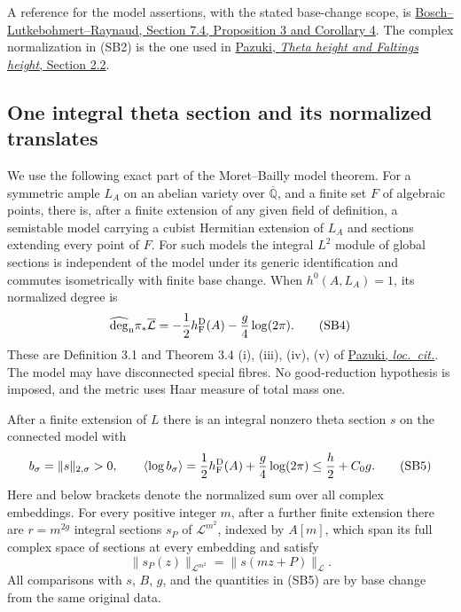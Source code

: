 A reference for the model assertions, with
the stated base-change scope, is
\href{https://www.math.stonybrook.edu/~kamenova/homepage_files/Bosch_Raynaud_Neron_Model_tc.pdf}
{Bosch--Lutkebohmert--Raynaud, Section 7.4,
Proposition 3 and Corollary 4}.
The complex normalization in (SB2) is the
one used in
\href{https://www.numdam.org/item/BSMF_2012__140_1_19_0.pdf}
{Pazuki, \emph{Theta height and Faltings height},
Section 2.2}.

\subsection{One integral theta section and its normalized translates}

We use the following exact part of the
Moret--Bailly model theorem.
For a symmetric ample \(L_A\) on an abelian
variety over \(\overline{\mathbb Q}\), and a
finite set \(F\) of algebraic points, there is,
after a finite extension of any given field
of definition, a semistable model carrying
a cubist Hermitian extension of \(L_A\) and
sections extending every point of \(F\).
For such models the integral \(L^2\) module of
global sections is independent of the model
under its generic identification and commutes
isometrically with finite base change.
When \(h^0(A,L_A)=1\), its normalized degree is
\[
 \widehat{\deg}_{\mathrm n}\pi_*\overline{\mathcal L}
       =-{1\over2}h_{\mathrm F}^{\mathrm D}(A)
                              -{g\over4}\log(2\pi).  \tag{SB4}
\]
These are Definition 3.1 and Theorem 3.4
(i), (iii), (iv), (v) of
\href{https://www.numdam.org/item/BSMF_2012__140_1_19_0.pdf}
{Pazuki, \emph{loc.\ cit.}}.
The model may have disconnected special
fibres. No good-reduction hypothesis is
imposed, and the metric uses Haar measure
of total mass one.

\begin{srlemma}\label{lem:sr-slope-joint-theta-witness}
After a finite extension of \(L\) there is an
integral nonzero theta section \(s\) on the
connected model with
\[
 b_\sigma=\|s\|_{2,\sigma}>0,\qquad
 \langle\log b_\sigma\rangle
       ={1\over2}h_{\mathrm F}^{\mathrm D}(A)
                               +{g\over4}\log(2\pi)
       \le {h\over2}+C_0g.                           \tag{SB5}
\]
Here and below brackets denote the normalized
sum over all complex embeddings.
For every positive integer \(m\), after a
further finite extension there are
\(r=m^{2g}\) integral sections \(s_P\) of
\(\mathcal L^{m^2}\), indexed by \(A[m]\),
which span its full complex space of sections
at every embedding and satisfy
\[
 \|s_P(z)\|_{\mathcal L^{m^2}}
                   =\|s(mz+P)\|_{\mathcal L}.        \tag{SB6}
\]
All comparisons with \(s\), \(B\), \(g\), and
the quantities in (SB5) are by base change
from the same original data.
\end{srlemma}

